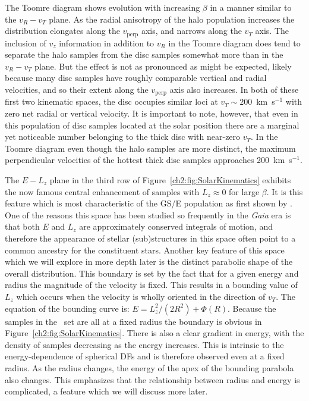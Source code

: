 The Toomre diagram shows evolution with increasing $\beta$ in a manner similar to the $v_{R}-v_{T}$ plane. As the radial anisotropy of the halo population increases the distribution elongates along the $v_\mathrm{perp}$ axis, and narrows along the $v_{T}$ axis. The inclusion of $v_{z}$ information in addition to $v_{R}$ in the Toomre diagram does tend to separate the halo samples from the disc samples somewhat more than in the $v_{R}-v_{T}$ plane. But the effect is not as pronounced as might be expected, likely because many disc samples have roughly comparable vertical and radial velocities, and so their extent along the $v_\mathrm{perp}$ axis also increases. In both of these first two kinematic spaces, the disc occupies similar loci at $v_{T} \sim 200$~km~s$^{-1}$ with zero net radial or vertical velocity. It is important to note, however, that even in this population of disc samples located at the solar position there are a marginal yet noticeable number belonging to the thick disc with near-zero $v_{T}$. In the Toomre diagram even though the halo samples are more distinct, the maximum perpendicular velocities of the hottest thick disc samples approaches 200~km~s$^{-1}$. 

The $E-L_{z}$ plane in the third row of Figure~\ref{ch2:fig:SolarKinematics} exhibits the now famous central enhancement of samples with $L_{z} \approx 0$ for large $\beta$. It is this feature which is most characteristic of the GS/E population as first shown by \textcite{helmi18}. One of the reasons this space has been studied so frequently in the \textit{Gaia} era is that both $E$ and $L_{z}$ are approximately conserved integrals of motion, and therefore the appearance of stellar (sub)structures in this space often point to a common ancestry for the constituent stars. Another key feature of this space which we will explore in more depth later is the distinct parabolic shape of the overall distribution. This boundary is set by the fact that for a given energy and radius the magnitude of the velocity is fixed. This results in a bounding value of $L_{z}$ which occurs when the velocity is wholly oriented in the direction of $v_{T}$. The equation of the bounding curve is: $E = L_{z}^{2}/(2R^{2}) + \Phi(R)$. Because the samples in the \solar\ set are all at a fixed radius the boundary is obvious in Figure~\ref{ch2:fig:SolarKinematics}. There is also a clear gradient in energy, with the density of samples decreasing as the energy increases. This is intrinsic to the energy-dependence of spherical DFs \parencite[see chapter 4.3 in ][]{binney08} and is therefore observed even at a fixed radius. As the radius changes, the energy of the apex of the bounding parabola also changes. This emphasizes that the relationship between radius and energy is complicated, a feature which we will discuss more later.

